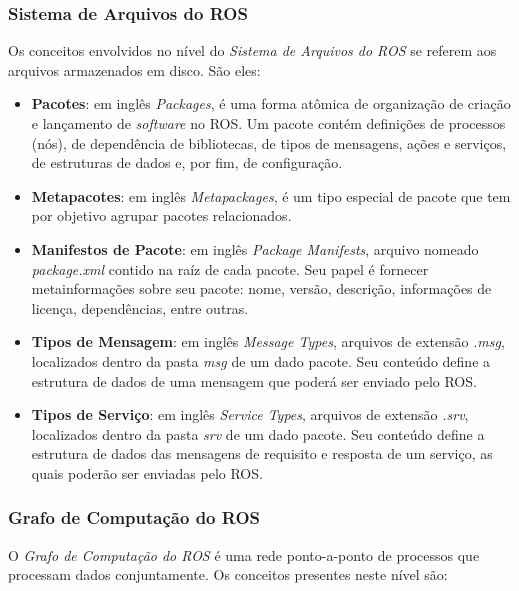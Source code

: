             \subsubsection{Sistema de Arquivos do ROS} \label{subsubsec:ros_arquivos}
                Os conceitos envolvidos no nível do \textit{Sistema de Arquivos do ROS} se referem aos arquivos armazenados em disco. São eles:
                
                \begin{itemize}
                    \item \textbf{Pacotes}: em inglês \textit{Packages}, é uma forma atômica de organização de criação e lançamento de \textit{software} no ROS. Um pacote contém definições de processos (nós), de dependência de bibliotecas, de tipos de mensagens, ações e serviços, de estruturas de dados e, por fim, de configuração. 
                    
                    \item \textbf{Metapacotes}: em inglês \textit{Metapackages}, é um tipo especial de pacote que tem por objetivo agrupar pacotes relacionados.
                    
                    \item \textbf{Manifestos de Pacote}: em inglês \textit{Package Manifests}, arquivo nomeado \textit{package.xml} contido na raíz de cada pacote. Seu papel é fornecer metainformações sobre seu pacote: nome, versão, descrição, informações de licença, dependências, entre outras. 
                    
                    \item \textbf{Tipos de Mensagem}: em inglês \textit{Message Types}, arquivos de extensão \textit{.msg}, localizados dentro da pasta \textit{msg} de um dado pacote. Seu conteúdo define a estrutura de dados de uma mensagem que poderá ser enviado pelo ROS.
                    
                    \item \textbf{Tipos de Serviço}: em inglês \textit{Service Types}, arquivos de extensão \textit{.srv}, localizados dentro da pasta \textit{srv} de um dado pacote. Seu conteúdo define a estrutura de dados das mensagens de requisito e resposta de um serviço, as quais poderão ser enviadas pelo ROS.
                \end{itemize}
            
            \subsubsection{Grafo de Computação do ROS} \label{subsubsec:ros_grafo}
                O \textit{Grafo de Computação do ROS} é uma rede ponto-a-ponto de processos que processam dados conjuntamente. Os conceitos presentes neste nível são:
                
